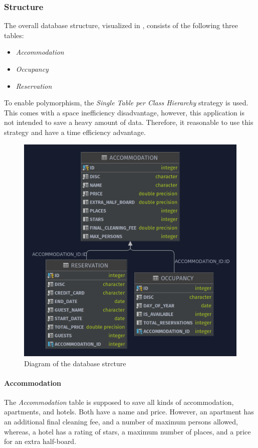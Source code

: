 \subsubsection{Structure}\label{sec:02_design_db_structure}
The overall database structure, visualized in , consists of the following three tables:
\begin{itemize}
\item \textit{Accommodation}
\item \textit{Occupancy}
\item \textit{Reservation}
\end{itemize}
To enable polymorphism, the \textit{Single Table per Class Hierarchy} strategy is used. This comes with a space inefficiency  disadvantage, however, this application is not intended to save a heavy amount of data. Therefore, it reasonable to use this strategy and have a time efficiency advantage. 

\begin{figure}[h]
\centering
\includegraphics[scale=0.3]{images/02_design/design-database}
\caption{Diagram of the database strcture}
\label{fig:02_design_db_structure_diagram}
\end{figure}

\paragraph{Accommodation}
The \textit{Accommodation} table is supposed to save all kinds of accommodation, apartments, and hotels. Both have a name and price. However, an apartment has an additional final cleaning fee, and a number of maximum persons allowed, whereas, a hotel has a rating of stars, a maximum number of places, and a price for an extra half-board.

